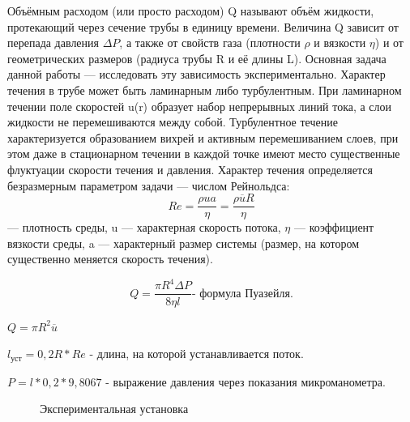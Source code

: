 \documentclass[a4paper, 12pt]{article}%
\begin{document}
	Объёмным расходом (или просто расходом) Q называют объём жидкости,
	протекающий через сечение трубы в единицу времени. Величина Q зависит от
	перепада давления $\Delta P$, а также от свойств газа (плотности $\rho$ и вязкости $\eta$) и от
	геометрических размеров (радиуса трубы R и её длины L). Основная задача
	данной работы — исследовать эту зависимость экспериментально.
	Характер течения в трубе может быть ламинарным либо турбулентным.
	При ламинарном течении поле скоростей u(r) образует набор непрерывных
	линий тока, а слои жидкости не перемешиваются между собой. Турбулентное течение характеризуется образованием вихрей и активным перемешиванием слоев, при этом даже в стационарном течении в каждой точке имеют место
	существенные флуктуации скорости течения и давления.
	Характер течения определяется безразмерным параметром задачи — числом Рейнольдса: $$ Re = \frac{\rho u a}{\eta}= \frac{\rho \overline u R}{\eta} $$ — плотность среды, u — характерная скорость потока, $\eta$ — коэффициент вязкости среды, a — характерный размер системы (размер, на котором	существенно меняется скорость течения).
	 
	$$ Q=\frac{\pi R^4 \Delta P}{8 \eta l} \text{- формула Пуазейля.}$$
	
	$Q=\pi R^2 \overline u$
	
	$ l_\text{уст} = 0,2 R*Re $ - длина, на которой устанавливается поток.
	
	$P=l * 0,2 * 9,8067$ - выражение давления через показания микроманометра.
	
		\begin{figure}[h]
		\caption{Экспериментальная установка}
	\end{figure}
	
	\newpage
		
\end{document}
